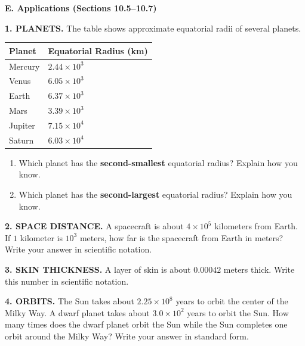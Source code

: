 \documentclass[11pt]{article}
\newcommand{\work}[1]{\vspace{#1}\par}
\begin{document}
\textbf{E. Applications (Sections 10.5--10.7)}

\textbf{1. PLANETS.} The table shows approximate equatorial radii of several planets.

\vspace{0.4em}
\begin{tabular}{|>{\raggedright\arraybackslash}p{2.1in}|>{\raggedleft\arraybackslash}p{2.6in}|}
\hline
\textbf{Planet} & \textbf{Equatorial Radius (km)}\\
\hline
Mercury & $2.44\times 10^{3}$\\
Venus   & $6.05\times 10^{3}$\\
Earth   & $6.37\times 10^{3}$\\
Mars    & $3.39\times 10^{3}$\\
Jupiter & $7.15\times 10^{4}$\\
Saturn  & $6.03\times 10^{4}$\\
\hline
\end{tabular}

\begin{enumerate}[label=\alph*.]
\item Which planet has the \textbf{second-smallest} equatorial radius? Explain how you know.
\work{1.3in}

\item Which planet has the \textbf{second-largest} equatorial radius? Explain how you know.
\work{1.3in}
\end{enumerate}

\vspace{0.6em}

\textbf{2. SPACE DISTANCE.} A spacecraft is about $4\times 10^{5}$ kilometers from Earth.
If $1$ kilometer is $10^{3}$ meters, how far is the spacecraft from Earth in meters?
Write your answer in scientific notation.
\work{1.8in}

\textbf{3. SKIN THICKNESS.} A layer of skin is about $0.00042$ meters thick.
Write this number in scientific notation.
\work{1.4in}

\textbf{4. ORBITS.} The Sun takes about $2.25\times 10^{8}$ years to orbit the center of the Milky Way.
A dwarf planet takes about $3.0\times 10^{2}$ years to orbit the Sun.
How many times does the dwarf planet orbit the Sun while the Sun completes one orbit around the Milky Way?
Write your answer in standard form.
\work{2.0in}
\end{document}
